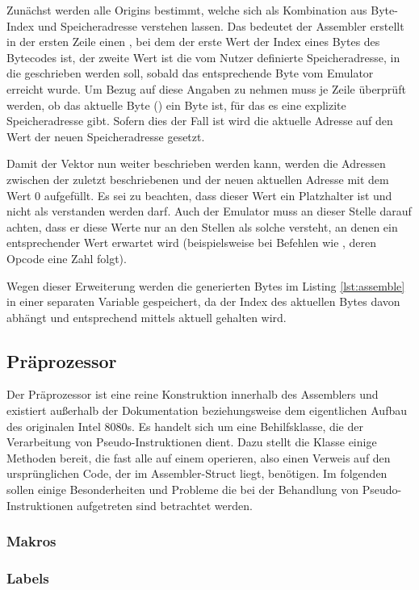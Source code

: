 Zunächst werden alle Origins bestimmt, welche sich als Kombination aus Byte-Index und Speicheradresse verstehen lassen. Das bedeutet der Assembler erstellt in der ersten Zeile einen , bei dem der erste Wert der Index eines Bytes des Bytecodes ist, der zweite Wert ist die vom Nutzer definierte Speicheradresse, in die geschrieben werden soll, sobald das entsprechende Byte vom Emulator erreicht wurde. Um Bezug auf diese Angaben zu nehmen muss je Zeile überprüft werden, ob das aktuelle Byte () ein Byte ist, für das es eine explizite Speicheradresse gibt. Sofern dies der Fall ist wird die aktuelle Adresse auf den Wert der neuen Speicheradresse gesetzt. 

Damit der Vektor nun weiter beschrieben werden kann, werden die Adressen zwischen der zuletzt beschriebenen und der neuen aktuellen Adresse mit dem Wert 0 aufgefüllt. Es sei zu beachten, dass dieser Wert ein Platzhalter ist und nicht als \grqq{} verstanden werden darf. Auch der Emulator muss an dieser Stelle darauf achten, dass er diese Werte nur an den Stellen als solche versteht, an denen ein entsprechender Wert erwartet wird (beispielsweise bei Befehlen wie , deren Opcode eine Zahl folgt).

Wegen dieser Erweiterung werden die generierten Bytes im Listing \ref{lst:assemble} in einer separaten Variable gespeichert, da der Index des aktuellen Bytes davon abhängt und entsprechend mittels
aktuell gehalten wird.

\subsection{Präprozessor}\label{chap:preprocessor}

Der Präprozessor ist eine reine Konstruktion innerhalb des Assemblers und existiert außerhalb der Dokumentation beziehungsweise dem eigentlichen Aufbau des originalen Intel 8080s. Es handelt sich um eine Behilfsklasse, die der Verarbeitung von Pseudo-Instruktionen dient. Dazu stellt die Klasse einige Methoden bereit, die fast alle auf einem  operieren, also einen Verweis auf den ursprünglichen Code, der im Assembler-Struct liegt, benötigen. Im folgenden sollen einige Besonderheiten und Probleme die bei der Behandlung von Pseudo-Instruktionen aufgetreten sind betrachtet werden.

\subsubsection{Makros}

\subsubsection{Labels}

